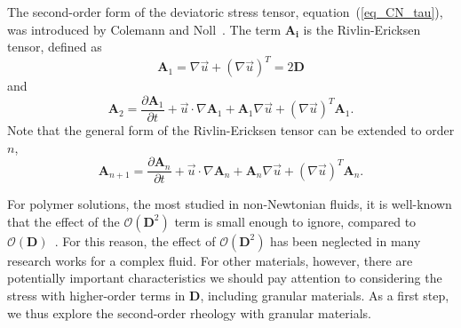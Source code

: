 The second-order form of the deviatoric stress tensor, equation~(\ref{eq_CN_tau}), was introduced by Colemann and Noll~\cite{coleman_approximation_1960}.
The term $\bm{A_i}$ is the Rivlin-Ericksen tensor, defined as
\begin{equation}
   {\bm A_1}  = \nabla \vec{u} +  \left( \nabla \vec{u} \right)^T = 2 \bm{D} 
   \label{eq_A1}
\end{equation}
and 
\begin{equation}
   \boldsymbol{A}_2
   =\frac{\partial \boldsymbol{A}_1}{\partial t} + \vec{u} \cdot \nabla \boldsymbol{A}_1+\boldsymbol{A}_1 \nabla \vec{u}+ \left(\nabla \vec{u} \right)^T \boldsymbol{A}_1.
   \label{eq_A2}
\end{equation}
Note that the general form of the Rivlin-Ericksen tensor can be extended to order $n$,  
\begin{equation}
  \boldsymbol{A}_{n+1}
  =\frac{\partial \boldsymbol{A}_{n}}{\partial t} + \vec{u} \cdot \nabla \boldsymbol{A}_n+\boldsymbol{A}_n \nabla \vec{u}+ \left(\nabla \vec{u} \right)^T \boldsymbol{A}_n.
\end{equation}
\par
For polymer solutions, the most studied in non-Newtonian fluids, it is well-known that the effect of the $\mathcal{O}\left( \bm{D}^2 \right)$ term is small enough to ignore, compared to  $\mathcal{O}\left( \bm{D} \right)$~\cite{bird_dynamics_1987}. For this reason, the effect of $\mathcal{O}\left( \bm{D}^2 \right)$ has been neglected in many research works for a complex fluid. 
For other materials, however, there are potentially important characteristics we should pay attention to considering the stress with higher-order terms in $\boldsymbol{D}$, including granular materials. 
As a first step, we thus explore the second-order rheology with granular materials.



